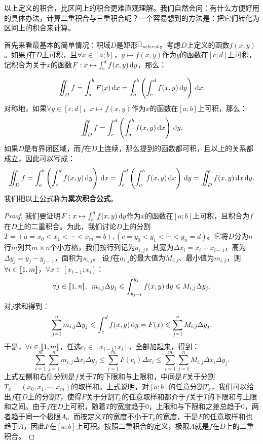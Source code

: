 \documentclass[12pt,UTF8]{ctexbook}
\begin{document}
以上定义的积合，比区间上的积合更难直观理解。我们自然会问：有什么方便好用的具体办法，计算二重积合与三重积合呢？一个容易想到的方法是：把它们转化为区间上的积合来计算。

首先来看最基本的简单情况：积域$D$是矩形$\rectbx_{a;b;c;d}$。考虑$D$上定义的函数$f(x,y)$。如果$f$在$D$上可积，且$\forall x\in[a;b]$，$y\mapsto f(x,y)$作为$y$的函数在$[c;d]$上可积，记积合为关于$x$的函数$F:x\mapsto \int_{c}^d f(x,y)\,\mathrm{d}y$，那么：
\begin{tm}
    $$ \int\!\!\!\!\!\int_{D} f = \int_{a}^b F(x)\,\mathrm{d}x = \int_{a}^b \left(\int_{c}^d f(x,y)\,\mathrm{d}y\right)\,\mathrm{d}x. $$
    对称地，如果$\forall y\in[c;d]$，$x\mapsto f(x,y)$作为$x$的函数在$[a;b]$上可积，那么：
    $$ \int\!\!\!\!\!\int_{D} f = \int_{c}^d \left(\int_{a}^b f(x,y)\,\mathrm{d}x\right)\,\mathrm{d}y. $$
    如果$D$是有界闭区域，而$f$在$D$上连续，那么提到的函数都可积，且以上的关系都成立，因此可以写成：
    $$ \jii_{D} f = \int_{a}^b \left(\int_{c}^d f(x,y)\di{y}\right)\di{x} = \int_{c}^d \left(\int_{a}^b f(x,y)\di{x}\right)\di{y} = \jii_{D} f(x,y) \di{x} \di{y}. $$
    我们把以上公式称为\textbf{累次积合公式}。
\end{tm}
\begin{proof}
    我们要证明$F:x\mapsto \int_{c}^d f(x,y)\,\mathrm{d}y$作为$x$的函数在$[a;b]$上可积，且积合为$f$在$D$上的二重积合。为此，我们讨论$D$上的分割$T=(a=x_0<x_1<\cdots<x_m=b),(c=y_0<y_1<\cdots<y_n=d)$。它将$D$分为$n$行$m$列共$m\times n$个小方格，我们按行列记为$a_{i,j}$，其宽为$\Delta x_i=x_i-x_{i-1}$，高为$\Delta y_j=y_j-y_{j-1}$，面积为$s_{i,j}$。  %
    设$f$在$a_{i,j}$的最大值为$M_{i,j}$、最小值为$m_{i,j}$，则$\forall i\in[\![1,m]\!]$，$\forall x\in[x_{i-1}; x_i]$：
    $$ \forall j\in[\![1,n]\!],\,\,\, m_{i,j} \Delta y_j \leqslant \int_{y_{j-1}}^{y_j} f(x, y)\,\mathrm{d}y\leqslant M_{i,j}\Delta y_j. $$
    对$j$求和得到：
    $$ \sum_{j=1}^n m_{i,j} \Delta y_j \leqslant \int_{c}^{d} f(x, y)\,\mathrm{d}y=F(x)\leqslant \sum_{j=1}^n  M_{i,j}\Delta y_j. $$
    于是，$\forall i\in[\![1,m]\!]$，任选$c_i\in[x_{i-1}; x_i]$，全部加起来，得到：
    $$ \sum_{i=1}^m\sum_{j=1}^n m_{i,j} \Delta x_i\Delta y_j \leqslant \sum_{i=1}^m F(c_i) \Delta x_i \leqslant \sum_{i=1}^m\sum_{j=1}^n  M_{i,j}\Delta x_i\Delta y_j. $$
    上式左侧和右侧分别是$f$关于$T$的下限和与上限和，中间是$F$关于分割$T_x=(x_0,x_1,\cdots,x_m)$的取样和。上式说明，对$[a;b]$的任意分割$T_x$，我们可以给出$f$在$D$上的分割$T$，使得$F$关于分割$T_x$的任意取样和都介于$f$关于$T$的下限和与上限和之间。由于$f$在$D$上可积，随着$T$的宽度趋于$0$，上限和与下限和之差总趋于$0$，两者趋于同一个极限$A$。而按定义$T$的宽度不小于$T_x$的宽度，于是$F$的任意取样和也趋于$A$，因此$F$在$[a;b]$上可积。按照二重积合的定义，极限$A$就是$f$在$D$上的二重积合。
\end{proof}
\end{document}
